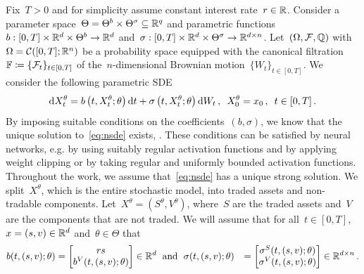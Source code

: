 Fix~$T>0$ and for simplicity assume constant interest rate~$r\in \mathbb{R}$. 
Consider a parameter space~$\Theta = \Theta^b\times \Theta^\sigma \subseteq \mathbb{R}^{q}$ and parametric functions~${b:[0,T]\times\mathbb{R}^d \times \Theta^b \rightarrow \mathbb{R}^{d}}$ and~${\sigma:[0,T]\times\mathbb{R}^d \times \Theta^\sigma \rightarrow \mathbb{R}^{d \times n}}$. Let~$(\Omega, \mathcal{F}, \mathbb{Q})$ with~$\Omega = \mathcal{C}([0,T];\mathbb{R}^n)$ be a probability space  equipped with the canonical filtration~$\mathbb{F}\coloneqq\{\mathcal{F}_t\}_{t\in[0,T]}$ of the~$n$-dimensional Brownian motion~$\{W_t\}_{t\in[0,T]}$. 
We consider the following parametric SDE
\begin{equation}\label{eq:nsde}
\mathrm{d} X^{\theta}_t= b\left(t,X_t^{\theta}; \theta\right) \mathrm{d} t + \sigma\left(t,X_t^\theta;\theta \right)\mathrm{d} W_t\,,\,\,\, X^\theta_0 = x_0\,,\,\,\, t \in [0,T]\,.
\end{equation}
 By imposing suitable conditions on the coefficients~$(b,\sigma)$, we know that the unique solution to~\eqref{eq:nsde} exists, \cite[Chapter 2]{Krylov1980ControlledProcesses}. 
These conditions can be satisfied by neural networks, e.g. by using suitably regular activation functions and by applying weight clipping or by taking regular and uniformly bounded activation functions. Throughout the work, we assume that~\eqref{eq:nsde} has a unique strong solution.
We split~$X^\theta$, which is the entire stochastic model, into traded assets and non-tradable components. 
Let~$X^\theta=(S^\theta, V^\theta)$, where~$S$ are the traded assets and~$V$ are the components that are not traded. 
We will assume that for all~$t\in[0,T]$, $x=(s, v)\in\nobreak\mathbb{R}^d$ and~$\theta \in \Theta$ that
\begin{align*}
b(t, (s,v); \theta) &= 
\begin{bmatrix}
rs \\ b^V(t,(s,v);\theta)
\end{bmatrix}\in\mathbb{R}^d \;\textup{ and }\;
\sigma(t,(s,v);\theta) &= \begin{bmatrix}\sigma^S(t,(s,v);\theta) \\ \sigma^V(t,(s,v);\theta)\end{bmatrix}\in\mathbb{R}^{d\times n}\,.
\end{align*}
